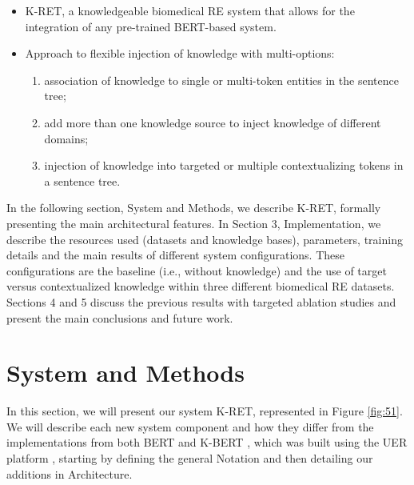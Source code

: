 \begin{itemize}
\item K-RET, a knowledgeable biomedical RE system that allows for the integration of any pre-trained BERT-based system.
\item Approach to flexible injection of knowledge with multi-options:
\begin{enumerate}
    \item association of knowledge to single or multi-token entities in the sentence tree;
    \item add more than one knowledge source to inject knowledge of different domains;
    \item injection of knowledge into targeted or multiple contextualizing tokens in a sentence tree. \vspace*{1pt} 
\end{enumerate}
\end{itemize}

In the following section, System and Methods, we describe K-RET, formally presenting the main architectural features. In Section 3, Implementation, we describe the resources used (datasets and knowledge bases), parameters, training details and the main results of different system configurations. These configurations are the baseline (i.e., without knowledge) and the use of target versus contextualized knowledge within three different biomedical RE datasets. Sections 4 and 5 discuss the previous results with targeted ablation studies and present the main conclusions and future work. 


\section{System and Methods}

In this section, we will present our system K-RET, represented in Figure \ref{fig:51}. We will describe each new system component and how they differ from the implementations from both BERT \citep{devlin2019bert} and K-BERT \citep{liu2020k}, which was built using the UER platform \citep{zhao2019uer}, starting by defining the general Notation and then detailing our additions in Architecture.   

